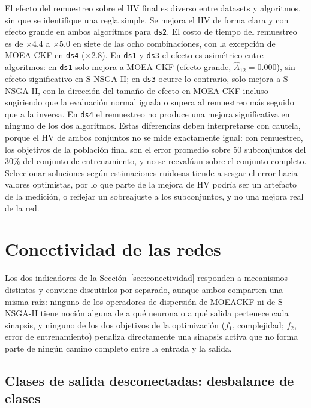 El efecto del remuestreo sobre el HV final es diverso entre datasets y algoritmos, sin que se identifique una regla simple. Se mejora el HV de forma clara y con efecto grande en ambos algoritmos para \texttt{ds2}. El costo de tiempo del remuestreo es de $\times4.4$ a $\times5.0$ en siete de las ocho combinaciones, con la excepción de MOEA-CKF en \texttt{ds4} ($\times2.8$). En \texttt{ds1} y \texttt{ds3} el efecto es asimétrico entre algoritmos: en \texttt{ds1} solo mejora a MOEA-CKF (efecto grande, $\hat{A}_{12}=0.000$), sin efecto significativo en S-NSGA-II; en \texttt{ds3} ocurre lo contrario, solo mejora a S-NSGA-II, con la dirección del tamaño de efecto en MOEA-CKF incluso sugiriendo que la evaluación normal iguala o supera al remuestreo más seguido que a la inversa. En \texttt{ds4} el remuestreo no produce una mejora significativa en ninguno de los dos algoritmos. Estas diferencias deben interpretarse con cautela, porque el HV de ambos conjuntos no se mide exactamente igual: con remuestreo, los objetivos de la población final son el error promedio sobre 50 subconjuntos del 30\% del conjunto de entrenamiento, y no se reevalúan sobre el conjunto completo. Seleccionar soluciones según estimaciones ruidosas tiende a sesgar el error hacia valores optimistas, por lo que parte de la mejora de HV podría ser un artefacto de la medición, o reflejar un sobreajuste a los subconjuntos, y no una mejora real de la red.

\section{Conectividad de las redes}
\label{sec:discusion-conectividad-v2}

Los dos indicadores de la Sección~\ref{sec:conectividad} responden a mecanismos distintos y conviene discutirlos por separado, aunque ambos comparten una misma raíz: ninguno de los operadores de dispersión de MOEACKF ni de S-NSGA-II tiene noción alguna de a qué neurona o a qué salida pertenece cada sinapsis, y ninguno de los dos objetivos de la optimización ($f_1$, complejidad; $f_2$, error de entrenamiento) penaliza directamente una sinapsis activa que no forma parte de ningún camino completo entre la entrada y la salida.

\subsection{Clases de salida desconectadas: desbalance de clases}

